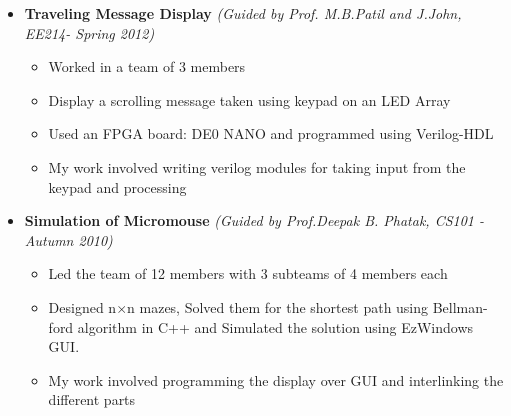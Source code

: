 \documentclass[a4paper,11pt]{article}
\newcommand{\isep}{-2 pt}
\begin{document}
\begin{itemize}
    \item \textbf{Traveling Message Display} \hfill \emph{(Guided by Prof. M.B.Patil and J.John, EE214- Spring 2012)}\\[-0.6cm]
    \begin{itemize}\itemsep \isep
        \item Worked in a team of 3 members
        \item Display a scrolling message taken using keypad on an LED Array
        \item Used an FPGA board: DE0 NANO and programmed using Verilog-HDL
        \item My work involved writing verilog modules for taking input from the keypad and processing
    \end{itemize}
        \item \textbf{Simulation of Micromouse} \hfill \emph{(Guided by Prof.Deepak B. Phatak, CS101 - Autumn 2010)}\\[-0.6cm]
    \begin{itemize}\itemsep \isep 
        \item Led the team of 12 members with 3 subteams of 4 members each
        \item Designed n$\times$n mazes, Solved them for the shortest path using Bellman-ford algorithm in C++ and Simulated the solution using EzWindows GUI.
        \item My work involved programming the display over GUI and interlinking the different parts
    \end{itemize}
\begin{comment}
\item \textbf{Term paper on Working of a Cordless Telephone} \emph{(Guided by Prof. Vasi J. , EE112 - Spring 2011)\\[-0.6cm]}
    \begin{itemize} \itemsep \isep
      \item Opened and Analyzed a Cordless phone.
      \item Worked in a team of 3 members.
      \item Written a 12-page Term paper with details of working of the phone.
    \end{itemize}
\end{comment}
\end{itemize}
\end{document}
